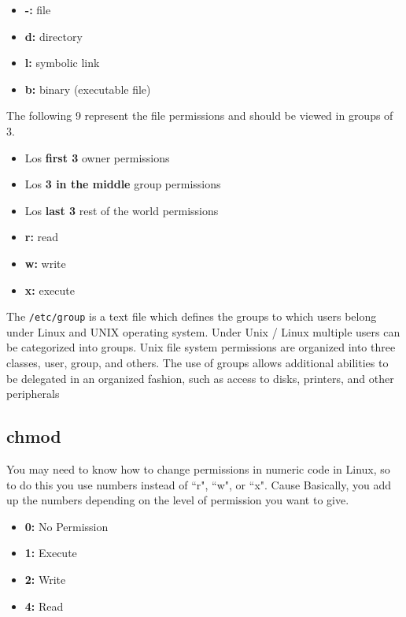 \documentclass{article}
\newenvironment{blocktemplateII}[1]{%
    \tcolorbox[beamer,%
    noparskip,breakable,
    colframe=Green,%
    colbacklower=LimeGreen!75!LightGreen,%
    title=#1]}%
    {\endtcolorbox}
\begin{document}
\begin{itemize}
    \item \textbf{-:} file
    \item \textbf{d:} directory
    \item \textbf{l:} symbolic link
    \item \textbf{b:} binary (executable file)
\end{itemize}

The following 9 represent the file permissions and should be viewed in groups of 3.

\begin{itemize}
    \item Los \textbf{first 3} owner permissions 
    \item Los \textbf{3 in the middle} group permissions
    \item Los \textbf{last 3} rest of the world permissions
\end{itemize}
\begin{itemize}
    \item \textbf{r:} read
    \item \textbf{w:} write 
    \item \textbf{x:} execute
\end{itemize}

\begin{blocktemplateII}{Note}
The \verb+/etc/group+ is a text file which defines the groups to which users belong under Linux and UNIX operating system. Under Unix / Linux multiple users can be categorized into groups. Unix file system permissions are organized into three classes, user, group, and others. The use of groups allows additional abilities to be delegated in an organized fashion, such as access to disks, printers, and other peripherals    
\end{blocktemplateII}

\subsection{chmod}

You may need to know how to change permissions in numeric code in Linux, so to do this you use numbers instead of “r", “w", or “x". Cause Basically, you add up the numbers depending on the level of permission you want to give.

\begin{itemize}
    \item \textbf{0:} No Permission
    \item \textbf{1:} Execute
    \item \textbf{2:} Write
    \item \textbf{4:} Read
\end{itemize}
\end{document}
